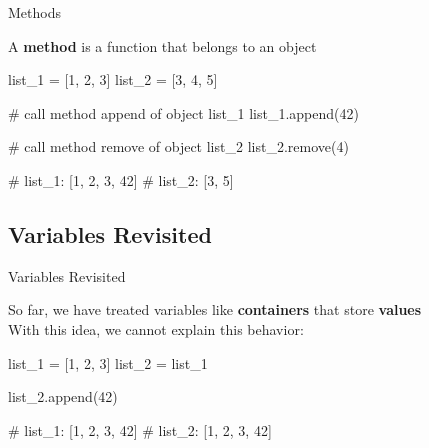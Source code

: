 \begin{frame}[fragile]{Methods}

    \begin{block}{}
        A \textbf{method} is a function that belongs to an object
    \end{block}

    \begin{pythoncode}
    list_1 = [1, 2, 3]
    list_2 = [3, 4, 5]

    # call method append of object list_1
    list_1.append(42)

    # call method remove of object list_2
    list_2.remove(4)

    # list_1: [1, 2, 3, 42]
    # list_2: [3, 5]
    \end{pythoncode}


\end{frame}

\subsection{Variables Revisited}

\begin{frame}[fragile]{Variables Revisited}

    So far, we have treated variables like \textbf{containers} that store \textbf{values} \\
    With this idea, we cannot explain this behavior:

    \vspace{1em}

    \begin{pythoncode}
    list_1 = [1, 2, 3]
    list_2 = list_1

    list_2.append(42)

    # list_1: [1, 2, 3, 42]
    # list_2: [1, 2, 3, 42]
    \end{pythoncode}

\end{frame}

